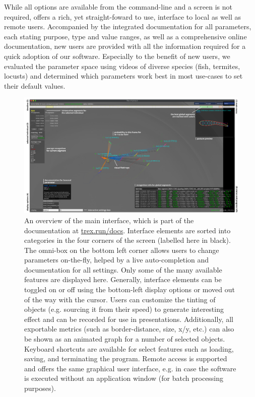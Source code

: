\documentclass[9pt,lineno]{elife}
\newcommand{\TRex}{\protect\path{TRex}}
\newcommand{\changemade}[1]{#1}
\begin{document}
While all options are available from the command-line and a screen is not required, \TRex{} offers a rich, yet straight-foward to use, interface to local as well as remote users. Accompanied by the integrated documentation for all parameters, each stating purpose, type and value ranges, as well as a comprehensive online documentation, \changemade{new users are provided with all the information required for a quick adoption of our software.} Especially to the benefit of new users, we evaluated the parameter space \changemade{using videos of diverse species} (fish, termites, locusts) and determined which parameters work best in most use-cases to set their default values.

\begin{figure}[h]
\includegraphics[width=1.0\linewidth]{figures/trex_screenshot.pdf}
\caption{An overview of \TRex{'} the main interface, which is part of the documentation at \href{https://trex.run/docs}{trex.run/docs}. Interface elements are sorted into categories in the four corners of the screen (labelled here in black). The omni-box on the bottom left corner allows users to change parameters on-the-fly, helped by a live auto-completion and documentation for all settings. Only some of the many available features are displayed here. Generally, interface elements can be toggled on or off using the bottom-left display options or moved out of the way with the cursor. Users can customize the tinting of objects (e.g. sourcing it from their speed) to generate interesting effect and can be recorded for use in presentations. Additionally, all exportable metrics (such as border-distance, size, x/y, etc.) can also be shown as an animated graph for a number of selected objects. Keyboard shortcuts are available for select features such as loading, saving, and terminating the program. Remote access is supported and offers the same graphical user interface, e.g. in case the software is executed without an application window (for batch processing purposes).}
\label{fig:trex_screenshot}
\end{figure}
\end{document}
